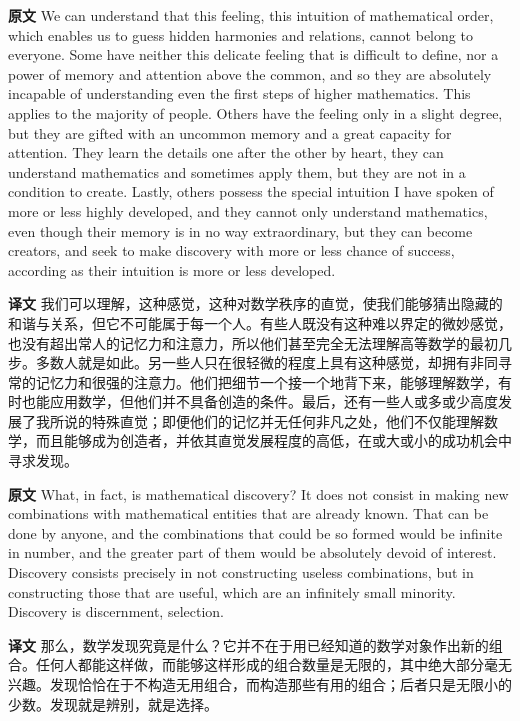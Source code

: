 \documentclass[UTF8]{ctexart}
\newenvironment{english}{\par\small\noindent\textbf{原文}\quad\ignorespaces}{\par}
\newenvironment{zhtranslation}{\par\noindent\textbf{译文}\quad\ignorespaces}{\par\vspace{0.35em}}
\begin{document}
\begin{english}
We can understand that this feeling, this intuition of mathematical order, which enables us to guess hidden harmonies and relations, cannot belong to everyone. Some have neither this delicate feeling that is difficult to define, nor a power of memory and attention above the common, and so they are absolutely incapable of understanding even the first steps of higher mathematics. This applies to the majority of people. Others have the feeling only in a slight degree, but they are gifted with an uncommon memory and a great capacity for attention. They learn the details one after the other by heart, they can understand mathematics and sometimes apply them, but they are not in a condition to create. Lastly, others possess the special intuition I have spoken of more or less highly developed, and they cannot only understand mathematics, even though their memory is in no way extraordinary, but they can become creators, and seek to make discovery with more or less chance of success, according as their intuition is more or less developed.
\end{english}
\begin{zhtranslation}
我们可以理解，这种感觉，这种对数学秩序的直觉，使我们能够猜出隐藏的和谐与关系，但它不可能属于每一个人。有些人既没有这种难以界定的微妙感觉，也没有超出常人的记忆力和注意力，所以他们甚至完全无法理解高等数学的最初几步。多数人就是如此。另一些人只在很轻微的程度上具有这种感觉，却拥有非同寻常的记忆力和很强的注意力。他们把细节一个接一个地背下来，能够理解数学，有时也能应用数学，但他们并不具备创造的条件。最后，还有一些人或多或少高度发展了我所说的特殊直觉；即便他们的记忆并无任何非凡之处，他们不仅能理解数学，而且能够成为创造者，并依其直觉发展程度的高低，在或大或小的成功机会中寻求发现。\end{zhtranslation}

\begin{english}
What, in fact, is mathematical discovery? It does not consist in making new combinations with mathematical entities that are already known. That can be done by anyone, and the combinations that could be so formed would be infinite in number, and the greater part of them would be absolutely devoid of interest. Discovery consists precisely in not constructing useless combinations, but in constructing those that are useful, which are an infinitely small minority. Discovery is discernment, selection.
\end{english}
\begin{zhtranslation}
那么，数学发现究竟是什么？它并不在于用已经知道的数学对象作出新的组合。任何人都能这样做，而能够这样形成的组合数量是无限的，其中绝大部分毫无兴趣。发现恰恰在于不构造无用组合，而构造那些有用的组合；后者只是无限小的少数。发现就是辨别，就是选择。\end{zhtranslation}
\end{document}
